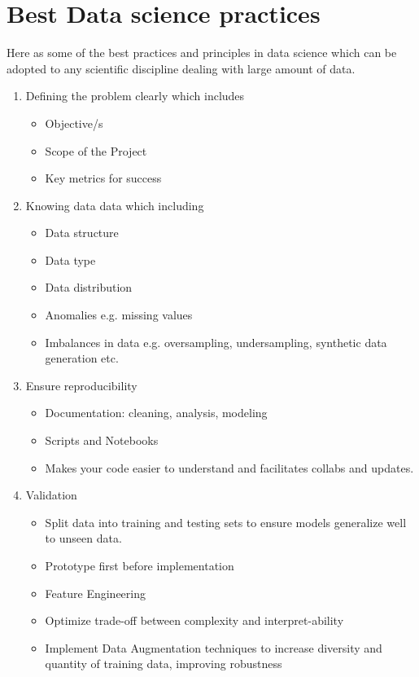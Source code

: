 \documentclass[11pt]{report}
\begin{document}
{\section{Best Data science practices}
	Here as some of the best practices and principles in data science which can be adopted to any scientific discipline dealing with large amount of data.
	\begin{multicols}{2}
	\begin{enumerate}
		\item Defining the problem clearly which includes
		\begin{itemize}
			\item Objective/s
			\item Scope of the Project
			\item Key metrics for success
		\end{itemize}
		\item Knowing data data which including
		\begin{itemize}
			\item Data structure
			\item Data type
			\item Data distribution
			\item Anomalies e.g. missing values
			\item Imbalances in data e.g. oversampling, undersampling, synthetic data generation etc. 
		\end{itemize}
		\item Ensure reproducibility
		\begin{itemize}
			\item Documentation: cleaning, analysis, modeling
			\item Scripts and Notebooks 
			\item Makes your code easier to understand and facilitates collabs and updates. 
		\end{itemize}
		\item Validation
		\begin{itemize}
			\item Split data into training and testing sets to ensure models generalize well to unseen data. \item Prototype first before implementation
			\item Feature Engineering
			\item Optimize trade-off between complexity and interpret-ability 
			\item Implement Data Augmentation techniques to increase diversity and quantity of training data, improving robustness

\end{itemize}
\end{enumerate}
\end{multicols}}
\end{document}
